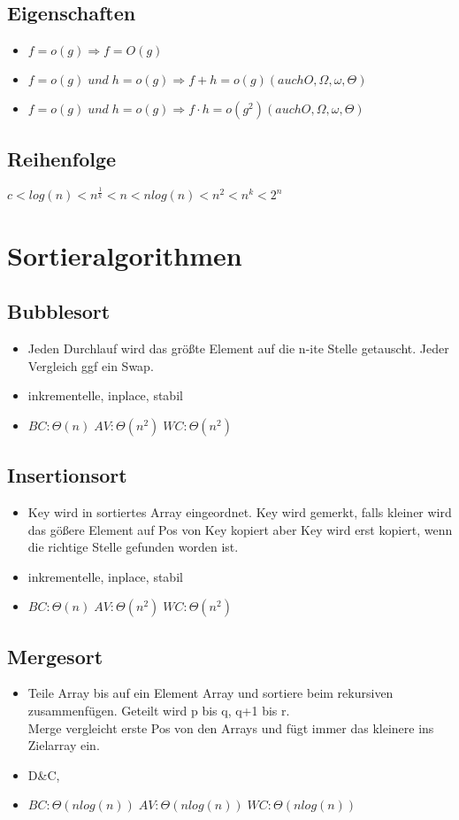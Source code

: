 \documentclass{article}
\begin{document}
\subsection{Eigenschaften}
\begin{itemize}
\item $f = o(g) \Rightarrow f = O(g)$
\item $f = o(g) \; und \;  h = o(g) \Rightarrow f+h = o(g) (auch O, \Omega, \omega, \Theta)$
\item $f = o(g) \; und \;  h = o(g) \Rightarrow f\cdot h = o(g^2) (auch O, \Omega, \omega, \Theta)$
\end{itemize}
\subsection{Reihenfolge}
$c < log(n) < n^{\frac{1}{k}} < n < n log(n) < n^2 < n^k < 2^n$
\section{Sortieralgorithmen}
\subsection {Bubblesort}
\begin{itemize}
\item Jeden Durchlauf wird das größte Element auf die n-ite Stelle getauscht. Jeder Vergleich ggf ein Swap.
\item inkrementelle, inplace, stabil
\item $BC: \Theta(n)\; AV: \Theta(n^2) \; WC: \Theta(n^2)$
\end{itemize}

\subsection{Insertionsort}
\begin{itemize}
\item Key wird in sortiertes Array eingeordnet. Key wird gemerkt, falls kleiner wird das gö\ss ere Element auf Pos von Key kopiert aber Key wird erst kopiert, wenn die richtige Stelle gefunden worden ist.
\item inkrementelle, inplace, stabil
\item $BC: \Theta(n)\; AV: \Theta(n^2) \; WC: \Theta(n^2)$ 
\end{itemize}

\subsection{Mergesort}
\begin{itemize}
\item Teile Array bis auf ein Element Array und sortiere beim rekursiven zusammenfügen. Geteilt wird p bis q, q+1 bis r. \\
Merge vergleicht erste Pos von den Arrays und fügt immer das kleinere ins Zielarray ein.
\item D\&C, 
\item $BC: \Theta(nlog(n))\; AV:\Theta(nlog(n))\; WC: \Theta(nlog(n))\;$
\end{itemize}
\end{document}
